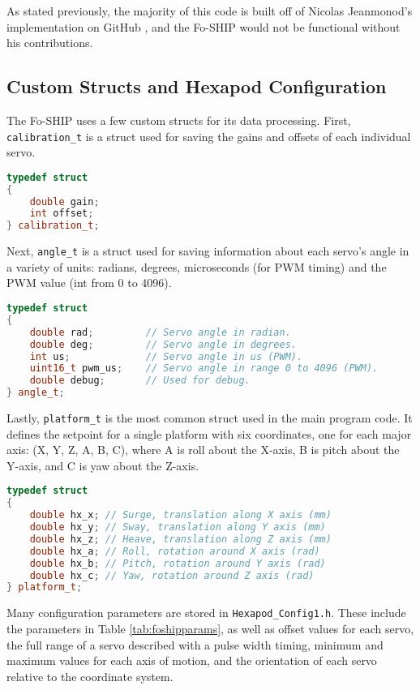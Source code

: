 \documentclass[11pt]{ucthesisCP}
\begin{document}
As stated previously, the majority of this code is built off of Nicolas Jeanmonod’s implementation on GitHub \cite{nichub}, and the Fo-SHIP would not be functional without his contributions.

\subsection{Custom Structs and Hexapod Configuration} \label{ssec:2s5s1}
The Fo-SHIP uses a few custom structs for its data processing. First, \verb|calibration_t| is a struct used for saving the gains and offsets of each individual servo. 

\begin{lstlisting}[language=C++]
typedef struct
{
	double gain;
	int offset;
} calibration_t;
\end{lstlisting}

Next, \verb|angle_t| is a struct used for saving information about each servo’s angle in a variety of units: radians, degrees, microseconds (for PWM timing) and the PWM value (int from 0 to 4096).

\begin{lstlisting}[language=C++]
typedef struct
{
	double rad;			// Servo angle in radian.
	double deg;			// Servo angle in degrees.
	int us;				// Servo angle in us (PWM).
	uint16_t pwm_us; 	// Servo angle in range 0 to 4096 (PWM).
	double debug;		// Used for debug.
} angle_t;
\end{lstlisting}

Lastly, \verb|platform_t| is the most common struct used in the main program code. It defines the setpoint for a single platform with six coordinates, one for each major axis: (X, Y, Z, A, B, C), where A is roll about the X-axis, B is pitch about the Y-axis, and C is yaw about the Z-axis.

\begin{lstlisting}[language=C++]
typedef struct
{
	double hx_x; // Surge, translation along X axis (mm)
	double hx_y; // Sway, translation along Y axis (mm)
	double hx_z; // Heave, translation along Z axis (mm)
	double hx_a; // Roll, rotation around X axis (rad)
	double hx_b; // Pitch, rotation around Y axis (rad)
	double hx_c; // Yaw, rotation around Z axis (rad)
} platform_t;
\end{lstlisting}

Many configuration parameters are stored in \verb|Hexapod_Config1.h|. These include the parameters in Table \ref{tab:foshipparams}, as well as offset values for each servo, the full range of a servo described with a pulse width timing, minimum and maximum values for each axis of motion, and the orientation of each servo relative to the coordinate system.
\end{document}

